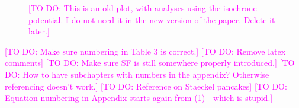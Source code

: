 \documentclass[iop,revtex4]{emulateapj}
\newcommand{\Wilma}[1]{\textcolor{Magenta}{#1}}
\newcommand{\OLD}[1]{}
\begin{document}
\begin{appendix}
\begin{figure}[!htbp]
\begin{minipage}{0.48\textwidth}
\caption{\Wilma{[TO DO: This is an old plot, with analyses using the isochrone potential. I do not need it in the new version of the paper. Delete it later.]} \OLD{Same as Figure \ref{fig:MWdhbIncompR_violins}, but without including information about the tangential velocities in the analysis. This was done by marginalizing the likelihood in Equation \eqref{eq:prob} over $v_T$ (bright grey violins; the dark grey violins are the same as in Figure \ref{fig:MWdhbIncompR_violins} for comparison). The parameter recovery is much worse than in Figure \ref{fig:MWdhbIncompR_violins}. This could indicate that much of the information about the potential is actually stored in the rotation curve, i.e., $v_T(R)$, which is not affected by removing stars from the data set. But even if we do not include $v_T$ we can still recover the potential within the errors, at least for small ($\epsilon_r \lesssim 0.15$).}} 
\label{fig:isoSphFlexIncompR_marginal_violins}
\end{minipage}
\end{figure}

\end{appendix}

\Wilma{[TO DO: Make sure numbering in Table 3 is correct.]}
\Wilma{[TO DO: Remove latex comments]}
\Wilma{[TO DO: Make sure SF is still somewhere properly introduced.]}
\Wilma{[TO DO: How to have subchapters with numbers in the appendix? Otherwise referencing doesn't work.]}
\Wilma{[TO DO: Reference on Staeckel pancakes]}
\Wilma{[TO DO: Equation numbering in Appendix starts again from (1) - which is stupid.]}
\end{document}
